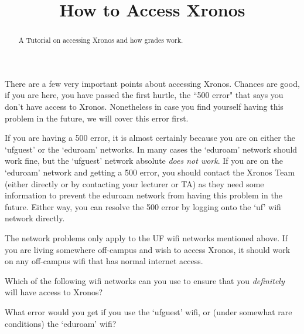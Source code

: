 \documentclass{ximeraXloud}
\title{How to Access Xronos}
\begin{document}
\begin{abstract}
A Tutorial on accessing Xronos and how grades work.
\end{abstract}
\maketitle

There are a few very important points about accessing Xronos. Chances are good, if you are here, you have passed the first hurtle, the ``500 error" that says you don't have access to Xronos. Nonetheless in case you find yourself having this problem in the future, we will cover this error first.

If you are having a 500 error, it is almost certainly because you are on either the `ufguest' or the `eduroam' networks. In many cases the `eduroam' network should work fine, but the `ufguest' network absolute \textit{does not work}. If you are on the `eduroam' network and getting a 500 error, you should contact the Xronos Team (either directly or by contacting your lecturer or TA) as they need some information to prevent the eduroam network from having this problem in the future. Either way, you can resolve the 500 error by logging onto the `uf' wifi network directly.

The network problems only apply to the UF wifi networks mentioned above. If you are living somewhere off-campus and wish to access Xronos, it should work on any off-campus wifi that has normal internet access.

\begin{problem}
    Which of the following wifi networks can you use to ensure that you \textit{definitely} will have access to Xronos?
    \begin{selectAll}
    \end{selectAll}
    \begin{problem}
        What error would you get if you use the `ufguest' wifi, or (under somewhat rare conditions) the `eduroam' wifi?
        \begin{multipleChoice}
        \end{multipleChoice}
    \end{problem}
\end{problem}
\end{document}
